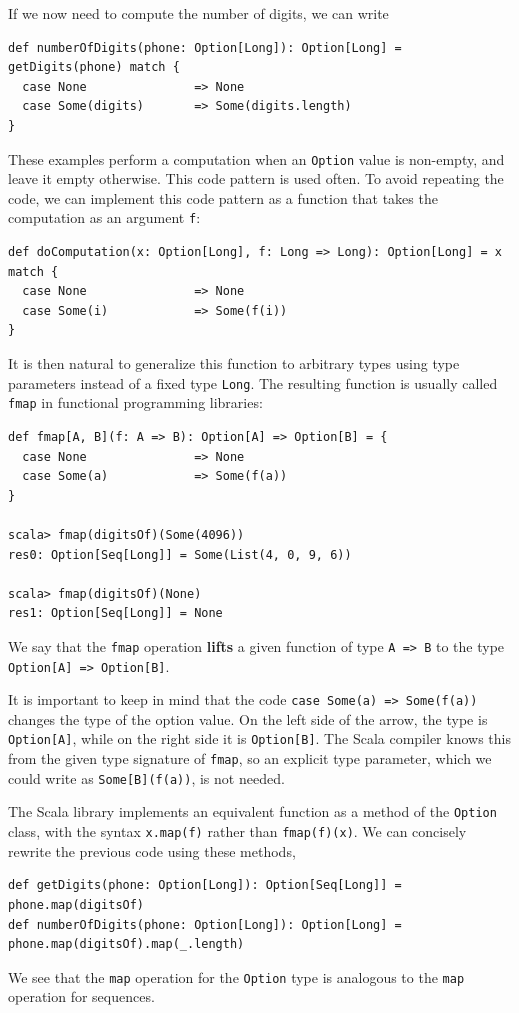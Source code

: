 If we now need to compute the number of digits, we can write
\begin{lstlisting}
def numberOfDigits(phone: Option[Long]): Option[Long] = getDigits(phone) match {
  case None               => None
  case Some(digits)       => Some(digits.length)
}
\end{lstlisting}

These examples perform a computation when an \lstinline!Option! value
is non-empty, and leave it empty otherwise. This code pattern is used
often. To avoid repeating the code, we can implement this code pattern
as a function that takes the computation as an argument \lstinline!f!:
\begin{lstlisting}
def doComputation(x: Option[Long], f: Long => Long): Option[Long] = x match {
  case None               => None
  case Some(i)            => Some(f(i))
}
\end{lstlisting}
It is then natural to generalize this function to arbitrary types
using type parameters instead of a fixed type \lstinline!Long!. The
resulting function is usually called \lstinline!fmap! in functional
programming libraries:
\begin{lstlisting}
def fmap[A, B](f: A => B): Option[A] => Option[B] = {
  case None               => None
  case Some(a)            => Some(f(a))
}

scala> fmap(digitsOf)(Some(4096))
res0: Option[Seq[Long]] = Some(List(4, 0, 9, 6))

scala> fmap(digitsOf)(None)
res1: Option[Seq[Long]] = None
\end{lstlisting}
We say that the \lstinline!fmap! operation \textbf{lifts}
a given function of type \lstinline!A => B! to the type \lstinline!Option[A] => Option[B]!. 

It is important to keep in mind that the code \lstinline!case Some(a) => Some(f(a))!
changes the type of the option value. On the left side of the arrow,
the type is \lstinline!Option[A]!, while on the right side it is
\lstinline!Option[B]!. The Scala compiler knows this from the given
type signature of \lstinline!fmap!, so an explicit type parameter,
which we could write as \lstinline!Some[B](f(a))!, is not needed.

The Scala library implements an equivalent function as a method of
the \lstinline!Option! class, with the syntax \lstinline!x.map(f)!
rather than \lstinline!fmap(f)(x)!. We can concisely rewrite the
previous code using these methods,
\begin{lstlisting}
def getDigits(phone: Option[Long]): Option[Seq[Long]] = phone.map(digitsOf)
def numberOfDigits(phone: Option[Long]): Option[Long] = phone.map(digitsOf).map(_.length)
\end{lstlisting}
We see that the \lstinline!map! operation for the \lstinline!Option!
type is analogous to the \lstinline!map! operation for sequences. 

